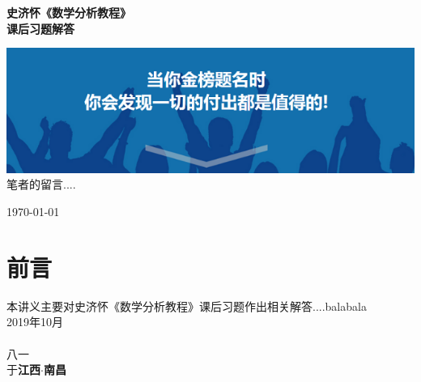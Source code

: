 \documentclass[cs5size]{ctexbook}
\theoremstyle{nonumberplain}%
\theoremstyle{nonumberplain}%
\theoremstyle{nonumberplain}%
\theoremstyle{nonumberplain}%
\theoremstyle{nonumberplain}%
\theoremstyle{plain}
\newcommand{\myTitlePage}{
	\begin{center}
		{
			\LARGE \textbf{史济怀《数学分析教程》}
			\\
			\vspace*{0.5em}
			\textbf{课后习题解答}\\
		}
		
		\vspace{2 cm}
		{
			\includegraphics[scale=0.6]{4.png}
			\\
			\vspace*{0.5em}
			笔者的留言....\\
		}
	
		\vspace{7 cm}
		{
			
			\huge \scshape %
			\today
		}
	\end{center}
}
\begin{document}
	\myTitlePage
	\tableofcontents
	
	\chapter*{前言}
	
	\bigskip
	本讲义主要对史济怀《数学分析教程》课后习题作出相关解答....balabala\\[10pt]
	\null\hfill                                                                2019年10月\\\\
	\null\hfill                                                                   八一\\
	\null\hfill                                                                于\textbf{江西$\cdot$南昌}
	
	
	
	
	
	
	
	
	
	
	
	
	
	
	
	
	
	
	
	
	
	
\end{document}
